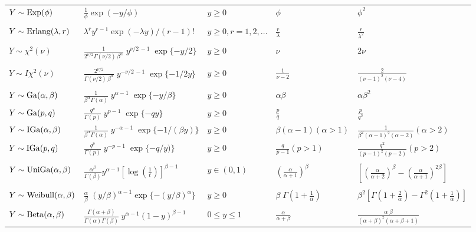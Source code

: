 \begin{tabular}{lllll}
$Y \sim {\rm Exp}(\phi)$ & $ \frac{1}{\phi}\exp(-y/\phi)$ & $y \geq 0$ & 
$ \phi$ & $\phi^2$ \\
\\
$Y \sim {\rm Erlang}(\lambda, r)$ & $ \lambda^r y^{r-1} \exp(-\lambda y)/(r-1)!$ & $y \geq 0,  r = 1, 2, \ldots$ & 
$ \frac{r}{\lambda}$ & $\frac{r}{\lambda^2}$ \\
\\
$Y \sim \chi^2(\nu)$ & $\frac{1}{2^{\nu/2}\Gamma(\nu/2) \, \beta^\alpha} \; y^{\nu/2 \,-1} \; \exp\{-y/2\}$ & $y \geq 0$  & $\nu$ & $2\nu$  \\
\\
$Y \sim I\chi^2(\nu)$ & $\frac{2^{\nu/2}}{\Gamma(\nu/2) \, \beta^\alpha} \; y^{-\nu/2 \,-1} \; \exp\{-1/2y\}$ & $y \geq 0$  & $\frac{1}{\nu-2}$ & $\frac{2}{(\nu-1)^2(\nu-4)}$  \\
\\
$Y \sim {\rm Ga}(\alpha, \beta)$ & $\frac{1}{\beta^\alpha\Gamma(\alpha)} \; y^{\alpha-1} \; \exp\{-y/\beta\}$ & $y \geq 0$  & $\alpha\beta$ & $\alpha\beta^2$  \\
	$Y \sim {\rm Ga}(p, q)$ & $\frac{q^p}{\Gamma(p)} \; y^{p-1} \; \exp\{-q y\}$ & $y \geq 0$  & $\frac{p}{q}$ & $\frac{p}{q^2}$  \\
$Y \sim {\rm IGa}(\alpha, \beta)$ & $\frac{1}{\beta^\alpha\Gamma(\alpha)} \; y^{-\alpha-1} \; \exp\{-1/(\beta y)\}$ & $y \geq 0$  & $\beta(\alpha-1) (\alpha>1)$  & $\frac{1}{\beta^2(\alpha-1)^2(\alpha-2)}(\alpha>2)$  \\
	$Y \sim {\rm IGa}(p, q)$ & $\frac{q^p}{\Gamma(p)} \; y^{-p-1} \; \exp\{-q/y)\}$ & $y \geq 0$  & $\frac{q}{p-1} (p>1)$  & $\frac{q^2}{(p-1)^2(p-2)}(p>2)$  \\
\\
$Y \sim {\rm UniGa}(\alpha, \beta)$ & $\frac{\alpha^{\beta}}{\Gamma(\beta)} y^{\alpha - 1} \left[\log\left(\frac{1}{t}\right) \right]^{\beta - 1}$  &  $y \in (0,1) $  & $\left(\frac{\alpha}{\alpha + 1}\right)^\beta$ &  $\left[\left(\frac{\alpha}{\alpha + 2}\right)^\beta - \left(\frac{\alpha}{\alpha + 1}\right)^{2\beta} \right]$ \\
\\
$Y \sim {\rm Weibull}(\alpha, \beta)$ & $\frac{\alpha}{\beta} \; (y/\beta)^{\alpha-1} \exp\{-(y/\beta)^{\alpha}\}$  &  $y \geq 0$  & $\beta \; \Gamma(1+\frac{1}{\alpha})$ &  $\beta^{2} \left[\Gamma(1+\frac{2}{\alpha}) - \Gamma^2(1+\frac{1}{\alpha}) \right]$ \\
\\
  $Y \sim {\rm Beta}(\alpha, \beta)$ & $\frac{\Gamma(\alpha+\beta)}{\Gamma(\alpha)\Gamma(\beta)} \; y^{\alpha-1} (1-y)^{\beta-1}$  &  $0 \leq y \leq 1$ & $\frac{\alpha}{\alpha+\beta}$ & $\frac{\alpha \; \beta}{(\alpha+\beta)^2 (\alpha + \beta + 1)}$ \\

\end{tabular}
